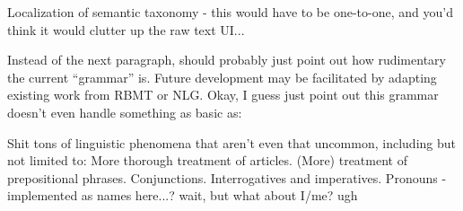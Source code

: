 Localization of semantic taxonomy - this would have to be one-to-one, and you'd think it would clutter up the raw text UI...


Instead of the next paragraph, should probably just point out how rudimentary the current ``grammar'' is. 
Future development may be facilitated by adapting existing work from RBMT or NLG. 
Okay, I guess just point out this grammar doesn't even handle something as basic as:

Shit tons of linguistic phenomena that aren't even that uncommon, including but not limited to:
More thorough treatment of articles.
(More) treatment of prepositional phrases.
Conjunctions.
Interrogatives and imperatives.
Pronouns - implemented as names here...? wait, but what about I/me? ugh






